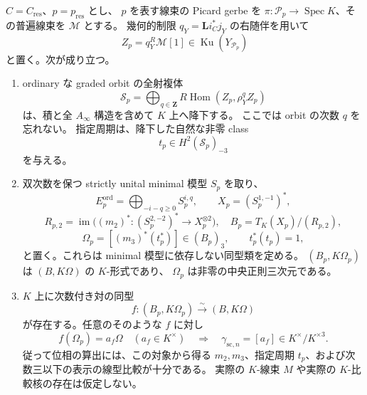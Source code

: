 \begin{proposition}
\label{prop:nfm-period-phase-low-products}
$C=C_{\mathrm{res}}$、$p=p_{\mathrm{res}}$ とし、
$p$ を表す線束の Picard gerbe を
$\pi:\mathscr P_p\to\operatorname{Spec}K$、その普遍線束を $\mathcal M$ とする。
幾何的制限 $q_Y=\mathbf Li_C^*j_Y$ の右随伴を用いて
\[
 Z_p=q_Y^R\mathcal M[1]
       \in\operatorname{Ku}(Y_{\mathscr P_p})
\]
と置く。次が成り立つ。
\begin{enumerate}[label=\textup{(\roman*)}]
\item ordinary な graded orbit の全射複体
\[
 \mathcal S_p=
 \bigoplus_{q\in\mathbf Z}
   R\operatorname{Hom}(Z_p,\rho_Y^qZ_p)
\]
は、積と全 $A_\infty$ 構造を含めて $K$ 上へ降下する。
ここでは orbit の次数 $q$ を忘れない。
指定周期は、降下した自然な非零 class
\[
 t_p\in H^2(\mathcal S_p)_{-3}
\]
を与える。

\item 双次数を保つ strictly unital minimal 模型 $S_p$ を取り、
\[
 E_p^{\mathrm{ord}}=
 \bigoplus_{-i-q\ge0}S_p^{i,q},\qquad
 X_p=(S_p^{1,-1})^*,
\]
\[
 R_{p,2}=\operatorname{im}
    \bigl((m_2)^*:(S_p^{2,-2})^*\to X_p^{\otimes2}\bigr),
 \quad B_p=T_K(X_p)/(R_{p,2}),
\]
\[
 \Omega_p=\left[(m_3)^*(t_p^*)\right]\in(B_p)_3,
 \qquad t_p^*(t_p)=1,
\]
と置く。これらは minimal 模型に依存しない同型類を定める。
$(B_p,K\Omega_p)$ は $(B,K\Omega)$ の $K$-形式であり、
$\Omega_p$ は非零の中央正則三次元である。

\item $K$ 上に次数付き対の同型
\[
 f:(B_p,K\Omega_p)\xrightarrow{\sim}(B,K\Omega)
\]
が存在する。任意のそのような $f$ に対し
\begin{equation}\label{eq:nfm-period-low-product-evaluation}
 f(\Omega_p)=a_f\Omega\quad(a_f\in K^\times)
 \quad\Longrightarrow\quad
 \gamma_{\mathrm{sc},n}=[a_f]
       \in K^\times/K^{\times3}.
\end{equation}
従って位相の算出には、この対象から得る
$m_2,m_3$、指定周期 $t_p$、および次数三以下の表示の線型比較が十分である。
実際の $K$-線束 $M$ や実際の $K$-比較核の存在は仮定しない。
\end{enumerate}
\end{proposition}

